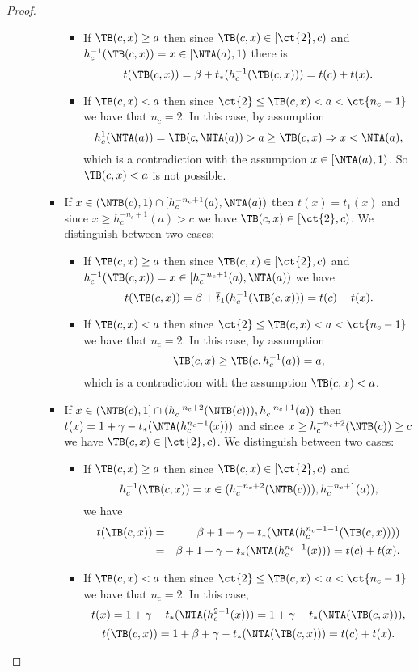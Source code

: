 \begin{proof}
\begin{enumerate}[label=(\roman*)]
\begin{itemize}
\begin{itemize}
				\begin{itemize}
					\item If $\TB(c,x) \geq a$ then since $\TB(c,x) \in [\ct{2},c)$ and $h_c^{-1}(\TB(c,x)) = x \in [\NTA(a),1)$ there is
					$$t(\TB(c,x)) = \beta + t_*(h_c^{-1}(\TB(c,x))) = t(c)+t(x).$$
					\item If $\TB(c,x) < a$ then since $\ct{2}\leq\TB(c,x)< a<\ct{n_c-1}$ we have that $n_c=2$. In this case, by assumption
					$$h_c^{1}(\NTA(a))=\TB(c,\NTA(a))>a \geq \TB(c,x) \Rightarrow x < \NTA(a),$$
					which is a contradiction with the assumption $x \in [\NTA(a),1)$.  So $\TB(c,x)<a$ is not possible.
				\end{itemize}
				\item If $x \in (\NTB(c),1) \cap [h_c^{-n_c+1}(a),\NTA(a))$ then $t(x)=\overline{t}_1(x)$ and  since $x \geq h_c^{-n_c+1}(a)> c$ we have $\TB(c,x) \in [\ct{2},c)$. We distinguish between two cases:
				\begin{itemize}
					\item If $\TB(c,x)\geq a$ then since $\TB(c,x) \in [\ct{2},c)$ and $h_c^{-1}(\TB(c,x)) = x \in [h_c^{-n_c+1}(a),\NTA(a))$ we have
					$$t(\TB(c,x)) = \beta + \overline{t}_1(h_c^{-1}(\TB(c,x))) = t(c)+t(x).$$
					\item If $\TB(c,x)< a$ then since $\ct{2}\leq\TB(c,x)< a<\ct{n_c-1}$ we have that $n_c=2$. In this case, by assumption
					$$\TB(c,x) \geq \TB(c,h_c^{-1}(a)) =a,$$
					which is a contradiction with the assumption $\TB(c,x)< a$.
				\end{itemize}
				\item If $x \in (\NTB(c),1] \cap (h_c^{-n_c+2}(\NTB(c))),h_c^{-n_c+1}(a))$ then $t(x)= 1 + \gamma - t_*(\NTA(h_c^{n_c-1}(x)))$ and  since $x \geq h_c^{-n_c+2}(\NTB(c)) \geq c$ we have $\TB(c,x) \in [\ct{2},c)$. We distinguish between two cases:
				\begin{itemize}
					\item If $\TB(c,x)\geq a$ then since $\TB(c,x) \in [\ct{2},c)$ and
					$$h_c^{-1}(\TB(c,x)) = x \in (h_c^{-n_c+2}(\NTB(c))),h_c^{-n_c+1}(a)),$$
					we have
					\begin{eqnarray*}
						t(\TB(c,x)) &=& \beta +1+\gamma-t_*(\NTA(h_c^{n_c-1-1}(\TB(c,x)))) \\
						&=&  \beta +1+\gamma-t_*(\NTA(h_c^{n_c-1}(x))) = t(c)+t(x).
					\end{eqnarray*}
					\item If $\TB(c,x) < a$ then since $\ct{2}\leq\TB(c,x)< a<\ct{n_c-1}$ we have that $n_c=2$. In this case,
					$$t(x)= 1 + \gamma - t_*(\NTA(h_c^{2-1}(x))) = 1 + \gamma - t_*(\NTA(\TB(c,x))),$$
					$$t(\TB(c,x))=1+\beta + \gamma - t_*(\NTA(\TB(c,x))) = t(c)+t(x).$$
					

\end{itemize}
\end{itemize}
\end{itemize}
\end{enumerate}
\end{proof}
